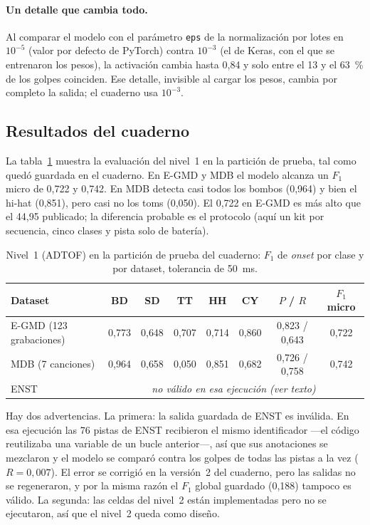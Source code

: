 \documentclass[11pt,a4paper]{article}
\begin{document}
\paragraph{Un detalle que cambia todo.} Al comparar el modelo con el parámetro \texttt{eps} de la
normalización por lotes en $10^{-5}$ (valor por defecto de PyTorch) contra $10^{-3}$ (el de Keras, con
el que se entrenaron los pesos), la activación cambia hasta 0{,}84 y solo entre el 13 y el 63~\% de los
golpes coinciden. Ese detalle, invisible al cargar los pesos, cambia por completo la salida; el
cuaderno usa $10^{-3}$.

\subsection{Resultados del cuaderno}
La tabla~\ref{tab:nb} muestra la evaluación del nivel~1 en la partición de prueba, tal como quedó
guardada en el cuaderno. En E-GMD y MDB el modelo alcanza un $F_1$ micro de 0{,}722 y 0{,}742. En MDB
detecta casi todos los bombos (0{,}964) y bien el hi-hat (0{,}851), pero casi no los toms (0{,}050). El
0{,}722 en E-GMD es más alto que el 44{,}95 publicado; la diferencia probable es el protocolo (aquí un kit
por secuencia, cinco clases y pista solo de batería).

\begin{table}[ht]
\centering
\caption{Nivel~1 (ADTOF) en la partición de prueba del cuaderno: $F_1$ de \emph{onset} por clase y por
dataset, tolerancia de 50~ms.}
\label{tab:nb}
\begin{tabular}{lccccccc}
\toprule
\textbf{Dataset} & \textbf{BD} & \textbf{SD} & \textbf{TT} & \textbf{HH} & \textbf{CY} & \textbf{$P$ / $R$} & \textbf{$F_1$ micro} \\
\midrule
E-GMD (123 grabaciones) & 0{,}773 & 0{,}648 & 0{,}707 & 0{,}714 & 0{,}860 & 0{,}823 / 0{,}643 & 0{,}722 \\
MDB (7 canciones) & 0{,}964 & 0{,}658 & 0{,}050 & 0{,}851 & 0{,}682 & 0{,}726 / 0{,}758 & 0{,}742 \\
ENST & \multicolumn{7}{c}{\emph{no válido en esa ejecución (ver texto)}} \\
\bottomrule
\end{tabular}
\end{table}

Hay dos advertencias. La primera: la salida guardada de ENST es inválida. En esa ejecución las 76 pistas
de ENST recibieron el mismo identificador ---el código reutilizaba una variable de un bucle anterior---,
así que sus anotaciones se mezclaron y el modelo se comparó contra los golpes de todas las pistas a la
vez ($R=0{,}007$). El error se corrigió en la versión~2 del cuaderno, pero las salidas no se
regeneraron, y por la misma razón el $F_1$ global guardado (0{,}188) tampoco es válido. La segunda: las
celdas del nivel~2 están implementadas pero no se ejecutaron, así que el nivel~2 queda como diseño.
\end{document}
